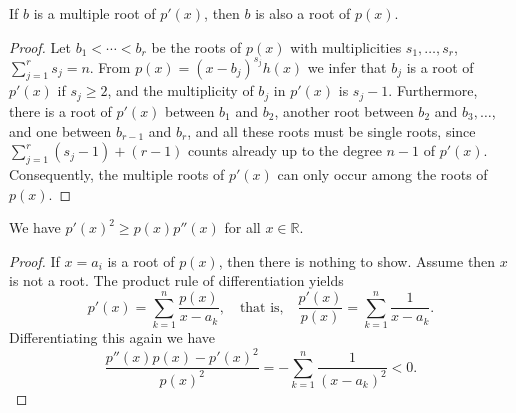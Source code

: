 \begin{theorem}[Fact 1]
  \label{ch23fact1}
  If $b$ is a multiple root of $p'(x)$, then $b$ is also a root of $p(x)$.
\end{theorem}
\begin{proof}
  Let $b_1 < \cdots < b_r$ be the roots of $p(x)$ with multiplicities $s_1, \ldots, s_r$, $\sum_{j=1}^{r} s_j = n$.
  From $p(x) = (x - b_j)^{s_j} h(x)$ we infer that $b_j$ is a root of $p'(x)$ if $s_j \geq 2$,
  and the multiplicity of $b_j$ in $p'(x)$ is $s_j - 1$. Furthermore,
  there is a root of $p'(x)$ between $b_1$ and $b_2$, another root between $b_2$ and $b_3, \ldots$,
  and one between $b_{r-1}$ and $b_r$, and all these roots must be single roots,
  since $\sum_{j=1}^{r} (s_j - 1) + (r - 1)$ counts already up to the degree $n - 1$ of $p'(x)$.
  Consequently, the multiple roots of $p'(x)$ can only occur among the roots of $p(x)$.
\end{proof}

\begin{theorem}[Fact 2]
  \label{ch23fact2}
  We have $p'(x)^2 \geq p(x)p''(x)$ for all $x \in \mathbb{R}$.
\end{theorem}
\begin{proof}
  If $x = a_i$ is a root of $p(x)$, then there is nothing to show. Assume then $x$ is not a root. The product rule of differentiation yields
  \[
  p'(x) = \sum_{k=1}^{n} \frac{p(x)}{x - a_k}, \quad \text{that is,} \quad \frac{p'(x)}{p(x)} = \sum_{k=1}^{n} \frac{1}{x - a_k}.
  \]
  Differentiating this again we have
  \[
  \frac{p''(x)p(x) - p'(x)^2}{p(x)^2} = - \sum_{k=1}^{n} \frac{1}{(x - a_k)^2} < 0.
  \]
\end{proof}
